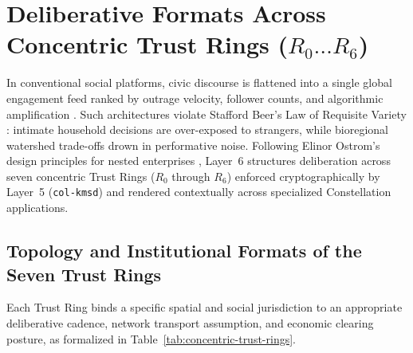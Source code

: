 \section{Deliberative Formats Across Concentric Trust Rings ($R_0 \dots R_6$)}
\label{sec:agora-trust-rings}

In conventional social platforms, civic discourse is flattened into a single global engagement feed ranked by outrage velocity, follower counts, and algorithmic amplification \parencite{zuboff2019,gray2018darkpatterns}. Such architectures violate Stafford Beer's Law of Requisite Variety \parencite{beer1972,ashby1956}: intimate household decisions are over-exposed to strangers, while bioregional watershed trade-offs drown in performative noise. Following Elinor Ostrom's design principles for nested enterprises \parencite{ostrom1990,ostrom2010}, Layer~6 structures deliberation across seven concentric Trust Rings ($R_0$ through $R_6$) enforced cryptographically by Layer~5 (\texttt{col-kmsd}) and rendered contextually across specialized Constellation applications.

\subsection{Topology and Institutional Formats of the Seven Trust Rings}

Each Trust Ring binds a specific spatial and social jurisdiction to an appropriate deliberative cadence, network transport assumption, and economic clearing posture, as formalized in Table~\ref{tab:concentric-trust-rings}.

